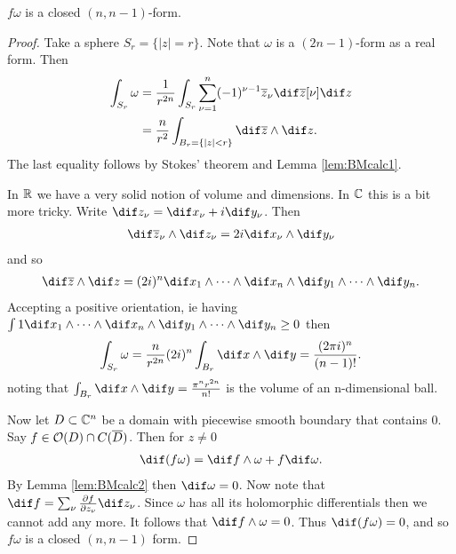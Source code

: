 \begin{lemma}\label{lem:BMcalc3}
    $f \omega$ is a closed $(n,n-1)$-form.
\end{lemma}
\begin{proof}
    Take a sphere $S_r = \{|z| = r\}$. Note that $\omega$ is a $(2n-1)$-form as a real form. Then
    \begin{align*}
        \int_{S_r} \omega &= \frac{1}{r^{2n}} \int_{S_r} \sum_{\nu = 1}^n (-1)^{\nu -1} \zz_\nu \dif \zz[\nu] \dif z\\
        &= \frac{n}{r^2} \int_{B_r = \{ |z| < r \}} \dif \zz \wedge \dif z.
    \end{align*}
    The last equality follows by Stokes' theorem and Lemma \ref{lem:BMcalc1}.

    In $\mathbb{R}$ we have a very solid notion of volume and dimensions. In $\mathbb{C}$ this is a bit more tricky. Write $\dif z_\nu = \dif x_\nu + i \dif y_\nu$. Then
    \begin{align*}
        \dif \zz_\nu \wedge \dif z_\nu = 2 i \dif x_\nu \wedge \dif y_\nu
    \end{align*}
    and so
    \begin{align*}
        \dif \zz \wedge \dif z = (2i)^n \dif x_1 \wedge \cdots \wedge \dif x_n \wedge \dif y_1 \wedge \cdots \wedge \dif y_n.
    \end{align*}
    Accepting a positive orientation, ie having $\int 1 \dif x_1 \wedge \cdots \wedge \dif x_n \wedge \dif y_1 \wedge \cdots \wedge \dif y_n \geq 0$ then
    \begin{align*}
        \int_{S_r} \omega = \frac{n}{r^{2n}} (2i)^n \int_{B_r} \dif x \wedge \dif y = \frac{(2 \pi i )^n}{(n-1)!}.
    \end{align*}
    noting that $\int_{B_r} \dif x \wedge \dif y = \frac{\pi^n r^{2n}}{n!}$ is the volume of an n-dimensional ball.

    Now let $D \subset \mathbb{C}^n$ be a domain with piecewise smooth boundary that contains $0$. Say $f \in \mathcal{O}(D) \cap C(\overline{D})$. Then for $z \neq 0$
    \begin{align*}
        \dif (f \omega) = \dif f \wedge \omega + f \dif \omega.
    \end{align*}
    By Lemma \ref{lem:BMcalc2} then $\dif \omega = 0$. Now note that $\dif f = \sum_\nu \frac{\difp f}{\difp z_\nu} \dif z_\nu $. Since $\omega$ has all its holomorphic differentials then we cannot add any more. It follows that $\dif f \wedge \omega = 0$. Thus $\dif (f \omega) = 0$, and so $f\omega$ is a closed $(n,n-1)$ form.
\end{proof}

